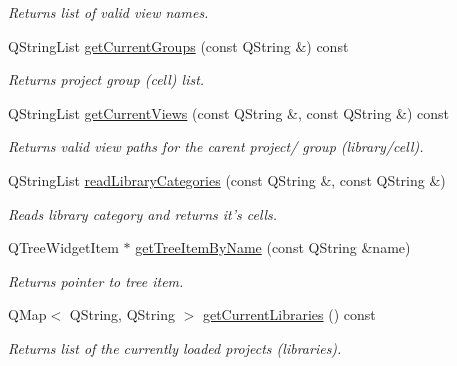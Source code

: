 \begin{DoxyCompactItemize}
\begin{DoxyCompactList}\small\item\em Returns list of valid view names. \end{DoxyCompactList}\item 
Q\-String\-List \hyperlink{classMainWindow_aadfbacf644193df620f494f5bf8106be}{get\-Current\-Groups} (const Q\-String \&) const 
\begin{DoxyCompactList}\small\item\em Returns project group (cell) list. \end{DoxyCompactList}\item 
Q\-String\-List \hyperlink{classMainWindow_a31c68c1e82618ac86398afd52f58c04e}{get\-Current\-Views} (const Q\-String \&, const Q\-String \&) const 
\begin{DoxyCompactList}\small\item\em Returns valid view paths for the carent project/ group (library/cell). \end{DoxyCompactList}\item 
Q\-String\-List \hyperlink{classMainWindow_a5f419797d8b22ee1c713e841931a23a4}{read\-Library\-Categories} (const Q\-String \&, const Q\-String \&)
\begin{DoxyCompactList}\small\item\em Reads library category and returns it's cells. \end{DoxyCompactList}\item 
Q\-Tree\-Widget\-Item $\ast$ \hyperlink{classMainWindow_ae23d791628eb7fb2d9edf8ee0649113c}{get\-Tree\-Item\-By\-Name} (const Q\-String \&name)
\begin{DoxyCompactList}\small\item\em Returns pointer to tree item. \end{DoxyCompactList}\item 
Q\-Map$<$ Q\-String, Q\-String $>$ \hyperlink{classMainWindow_ac6106cd3a58bfc4453ada97dd49cff63}{get\-Current\-Libraries} () const 
\begin{DoxyCompactList}\small\item\em Returns list of the currently loaded projects (libraries). \end{DoxyCompactList}\end{DoxyCompactItemize}

